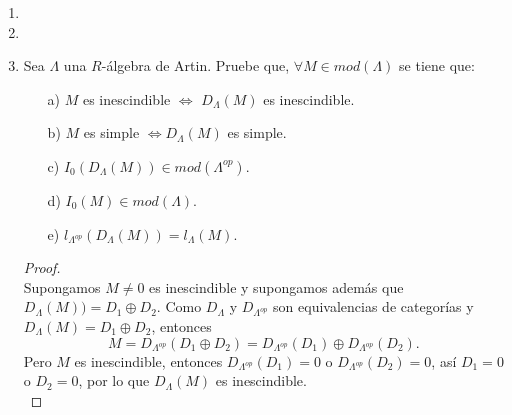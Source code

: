 \documentclass{article}
\begin{document}
\begin{enumerate}[label=\textbf{Ej \arabic*.}]
\begin{proof}
Ahora, si $a\in R$, $(zr)\cdot m=z\cdot(r\cdot m)=z\cdot 0=0$. Por lo tanto $ann_R(M)\unlhd R$.\\
\\
$\displaystyle ann_{\faktor{R}{ann_R(M)}}(M)=\{r\in \faktor{R}{ann_R(M)}\,|\, [r]\cdot m=0\}$ con $[r]$ denotando la clase de $r\in R$ bajo la
relación de equivalencia. Ahora, como $[r]\cdot m=0,$ entonces 
\[0=(r+ann_R(M))\cdot m=r\cdot m+0,\]
y así $r\in ann_R(M)$, es decir, $[r]=0$. Por lo tanto $M$ es un \\ $\faktor{R}{ann_R(M)}$-módulo fiel.\\
\\
Sean $f\in\operatorname{Hom}_R(R,M)$ y $r\in ann_R(M)$, entonces $r\cdot m=0\,\,\forall m\in M$ así, como $f$ es morfismo
$f(r)=r\cdot f(1)=0$ pues $f(1)\in M$. Por lo tanto $ann_R(M)\leq Ker(f)$.\\
\\
Sea $N\in Mod(R)$ tal que existe $h\in \operatorname{Hom}_R(M,N)$ isomorfismo. Entonces para cada $n\in N$ existe un único $m\in M$
tal que $h(m)=n$, así 
\begin{align*}
r\in ann_R(M) &\iff r\cdot m=0\,\,\,\forall m\in M\\
&\iff h(r\cdot m)=0\,\,\,\forall m\in M\\
&\iff r\cdot h(m)=0\,\,\,\forall m\in M\\
&\iff r\cdot n=0\,\,\,\forall n\in N\\
& \iff r\in ann_R(N).
\end{align*}
\end{proof}
\item
\item
\item Sea $\Lambda$ una $R$-álgebra de Artin. Pruebe que, $\forall M\in mod(\Lambda)$ se tiene que: 
\begin{itemize}
\item[a)] $M$ es inescindible $\iff$ $D_\Lambda(M)$ es inescindible.
\item[b)] $M$ es simple $\iff D_\Lambda(M)$ es simple.
\item[c)] $I_0(D_\Lambda(M))\in mod(\Lambda^{op})$.
\item[d)] $I_0(M)\in mod(\Lambda)$.
\item[e)] $l_{\Lambda^{op}}(D_\Lambda(M))=l_\Lambda(M).$
\end{itemize}
\begin{proof}
\\
Supongamos $M\neq 0$ es inescindible y supongamos además que\\ $D_\Lambda(M))=D_1\oplus D_2$. Como $D_\Lambda$ y 
$D_{\Lambda^{op}}$ son equivalencias de categorías y $D_\Lambda(M)=D_1\oplus D_2$, entonces 
\[M=D_{\Lambda^{op}}(D_1\oplus D_2)=D_{\Lambda^{op}}(D_1)\oplus D_{\Lambda^{op}}(D_2).\]
Pero $M$ es inescindible, entonces $D_{\Lambda^{op}}(D_1)=0$ o  $D_{\Lambda^{op}}(D_2)=0$, así $D_1=0$ o $D_2=0$, por lo que
$D_\Lambda(M)$ es inescindible.\\


\end{proof}
\end{enumerate}
\end{document}
